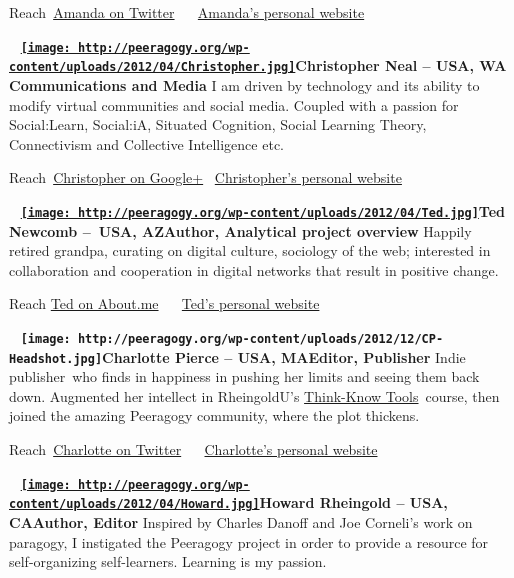 Reach~\href{https://twitter.com/\#!/amanda_lyons}{Amanda on Twitter}
~\textbar{} ~\href{www.visualsforchange.com/blog\%20\%20}{Amanda's
personal website}

~
\textbf{\href{http://peeragogy.org/wp-content/uploads/2012/04/Christopher.jpg}{\texttt{[image: http://peeragogy.org/wp-content/uploads/2012/04/Christopher.jpg]}}Christopher
Neal -- USA, WA} \textbf{Communications and Media} I am driven by
technology and its ability to modify virtual communities and social
media. Coupled with a passion for Social:Learn, Social:iA, Situated
Cognition, Social Learning Theory, Connectivism and Collective
Intelligence etc.

Reach~\href{https://plus.google.com/u/0/106960445015668581969/posts}{Christopher
on Google+} \textbar{}
~\href{http://beyondcredentials.com/index.php?option=com_bc_profile_pages\&uname=berkeleyalum}{Christopher's
personal website}

~
\textbf{\href{http://peeragogy.org/wp-content/uploads/2012/04/Ted.jpg}{\texttt{[image: http://peeragogy.org/wp-content/uploads/2012/04/Ted.jpg]}}Ted
Newcomb --~USA, AZ}\textbf{Author, Analytical project overview} Happily
retired grandpa, curating on digital culture, sociology of the web;
interested in collaboration and cooperation in digital networks that
result in positive change.

Reach \href{http://about.me/tcnewcomb}{Ted on About.me} ~\textbar{}
~\href{http://www.tcnewcomb.com}{Ted's personal website}

~
\textbf{\texttt{[image: http://peeragogy.org/wp-content/uploads/2012/12/CP-Headshot.jpg]}Charlotte
Pierce -- USA, MA}\textbf{Editor, Publisher} Indie publisher~who finds
in happiness in pushing her limits and seeing them back down. Augmented
her intellect in RheingoldU's
\href{http://socialmediaclassroom.com/host/think/}{Think-Know
Tools}~course, then joined the amazing Peeragogy community, where the
plot thickens.

Reach~\href{https://twitter.com/\#!/piercepress}{Charlotte on Twitter}
~\textbar{} ~\href{http://www.PiercePress.com}{Charlotte's personal
website}

~
\textbf{\href{http://peeragogy.org/wp-content/uploads/2012/04/Howard.jpg}{\texttt{[image: http://peeragogy.org/wp-content/uploads/2012/04/Howard.jpg]}}Howard
Rheingold -- USA, CA}\textbf{Author, Editor} Inspired by Charles Danoff
and Joe Corneli's work on paragogy, I instigated the Peeragogy project
in order to provide a resource for self-organizing self-learners.
Learning is my passion.

